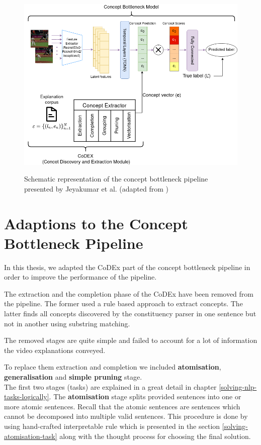 \begin{figure}[h]
\caption{Schematic representation of the concept bottleneck pipeline presented by Jeyakumar et al. (adapted from \cite{RefWorks:RefID:16-2021automatic})} 
\vspace{5pt}
\centering
\includegraphics[width=\textwidth]{concept-bottleneck-pipeline/vikranth-concept-bottleneck.png}
\label{vikranth-concept-bottleneck}
\end{figure}

\section{Adaptions to the Concept Bottleneck Pipeline}

In this thesis, we adapted the CoDEx part of the concept bottleneck pipeline in order to improve the performance of the pipeline.

The extraction and the completion phase of the CoDEx have been removed from the pipeline.
The former used a rule based approach to extract concepts.
The latter finds all concepts discovered by the constituency parser in one sentence but not in another using substring matching.

The removed stages are quite simple and failed to account for a lot of information the video explanations conveyed.

To replace them extraction and completion we included \textbf{atomisation}, \textbf{generalisation} and \textbf{simple pruning} stage. \\
The first two stages (tasks) are explained in a great detail in chapter \ref{solving-nlp-tasks-logically}.
The \textbf{atomisation} stage splits provided sentences into one or more atomic sentences. 
Recall that the atomic sentences are sentences which cannot be decomposed into multiple valid sentences.
This procedure is done by using hand-crafted interpretable rule which is presented in the section \ref{solving-atomisation-task} along with the thought process for choosing the final solution.

